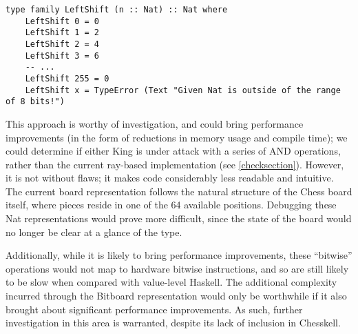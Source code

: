 \begin{lstlisting}
type family LeftShift (n :: Nat) :: Nat where
    LeftShift 0 = 0
    LeftShift 1 = 2
    LeftShift 2 = 4
    LeftShift 3 = 6
    -- ...
    LeftShift 255 = 0
    LeftShift x = TypeError (Text "Given Nat is outside of the range of 8 bits!")
\end{lstlisting}

This approach is worthy of investigation, and could bring performance improvements (in the form of reductions in memory usage and compile time); we could determine if either King is under attack with a series of AND operations, rather than the current ray-based implementation (see \cref{checksection}). However, it is not without flaws; it makes code considerably less readable and intuitive. The current board representation follows the natural structure of the Chess board itself, where pieces reside in one of the 64 available positions. Debugging these Nat representations would prove more difficult, since the state of the board would no longer be clear at a glance of the type.

Additionally, while it is likely to bring performance improvements, these ``bitwise'' operations would not map to hardware bitwise instructions, and so are still likely to be slow when compared with value-level Haskell. The additional complexity incurred through the Bitboard representation would only be worthwhile if it also brought about significant performance improvements. As such, further investigation in this area is warranted, despite its lack of inclusion in Chesskell.